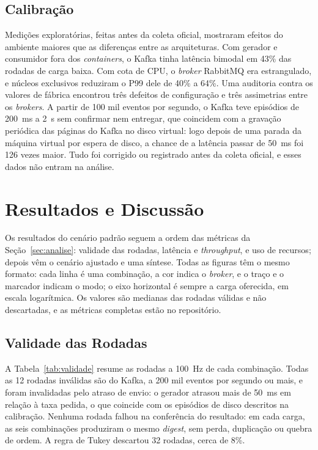 \documentclass[12pt]{article}
\begin{document}
\subsection{Calibração}
\label{sec:calibracao}

Medições exploratórias, feitas antes da coleta oficial, mostraram efeitos do ambiente
maiores que as
diferenças entre as arquiteturas. Com gerador e consumidor fora dos \textit{containers}, o Kafka
tinha latência bimodal em 43\% das rodadas de carga baixa. Com cota de CPU, o \textit{broker}
RabbitMQ era estrangulado, e núcleos exclusivos reduziram o P99 dele de 40\% a 64\%. Uma
auditoria contra os valores de fábrica encontrou três defeitos de configuração e três
assimetrias entre os \textit{brokers}. A partir de 100 mil eventos por segundo, o Kafka teve
episódios de 200~ms a 2~s sem confirmar nem entregar, que coincidem com a gravação
periódica das páginas do Kafka no disco virtual: logo depois de uma parada da máquina
virtual por espera de disco, a chance de a latência passar de 50~ms foi 126 vezes maior.
Tudo foi corrigido ou registrado antes da coleta oficial, e esses dados não entram na
análise.


\section{Resultados e Discussão}
\label{sec:resultados}

Os resultados do cenário padrão seguem a ordem das métricas da
Seção~\ref{sec:analise}: validade das rodadas, latência e \textit{throughput}, e uso de recursos;
depois vêm o cenário ajustado e uma síntese. Todas as figuras têm o mesmo formato: cada
linha é uma combinação, a cor indica o \textit{broker}, e o traço e o marcador indicam o modo; o
eixo horizontal é sempre a carga oferecida, em escala logarítmica. Os valores são medianas
das rodadas válidas e não descartadas, e as métricas completas estão no repositório.

\subsection{Validade das Rodadas}

A Tabela~\ref{tab:validade} resume as rodadas a 100~Hz de cada combinação. Todas as 12
rodadas inválidas são do Kafka, a 200 mil eventos por segundo ou mais, e foram invalidadas
pelo atraso de envio: o gerador atrasou mais de 50~ms em relação à taxa pedida, o que
coincide com os episódios de disco descritos na calibração. Nenhuma rodada falhou na
conferência do resultado: em cada carga, as seis combinações produziram o mesmo \textit{digest},
sem perda, duplicação ou quebra de ordem. A regra de Tukey descartou 32 rodadas, cerca de
8\%.
\end{document}

